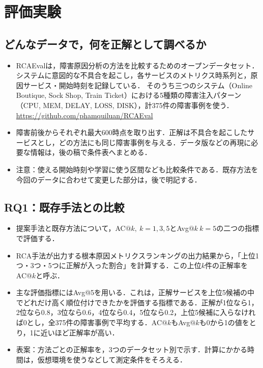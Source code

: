 \section{評価実験}
\label{sec:experiment}

\subsection{どんなデータで，何を正解として調べるか}
\begin{itemize}
    \item RCAEvalは，障害原因分析の方法を比較するためのオープンデータセット．システムに意図的な不具合を起こし，各サービスのメトリクス時系列と，原因サービス・開始時刻を記録している．
    そのうち三つのシステム（Online Boutique, Sock Shop, Train Ticket）における5種類の障害注入パターン（CPU, MEM, DELAY, LOSS, DISK），計375件の障害事例を使う．\\
    \href{https://github.com/phamquiluan/RCAEval}{https://github.com/phamquiluan/RCAEval}
    \item 障害前後からそれぞれ最大600時点を取り出す．正解は不具合を起こしたサービスとし，どの方法にも同じ障害事例を与える．データ版などの再現に必要な情報は，後の稿で条件表へまとめる．
    \item 注意：使える開始時刻や学習に使う区間なども比較条件である．既存方法を今回のデータに合わせて変更した部分は，後で明記する．
\end{itemize}


\subsection{RQ1：既存手法との比較}
\begin{itemize}
    \item 提案手法と既存方法について，AC$@k, \:k=1,3,5$とAvg$@k\:k=5$の二つの指標で評価する．
    \item RCA手法が出力する根本原因メトリクスランキングの出力結果から，「上位1つ・3つ・5つに正解が入った割合」を計算する．この上位$k$件の正解率をAC@$k$と呼ぶ．
    \item 主な評価指標にはAvg@5を用いる．これは，正解サービスを上位5候補の中でどれだけ高く順位付けできたかを評価する指標である．正解が1位なら1，2位なら0.8，3位なら0.6，4位なら0.4，5位なら0.2，上位5候補に入らなければ0とし，全375件の障害事例で平均する．AC$@k$もAvg$@k$も0から1の値をとり，1に近いほど正解率が高い．
    \item 表案：方法ごとの正解率を，3つのデータセット別で示す．計算にかかる時間は，仮想環境を使うなどして測定条件をそろえる．
\end{itemize}

